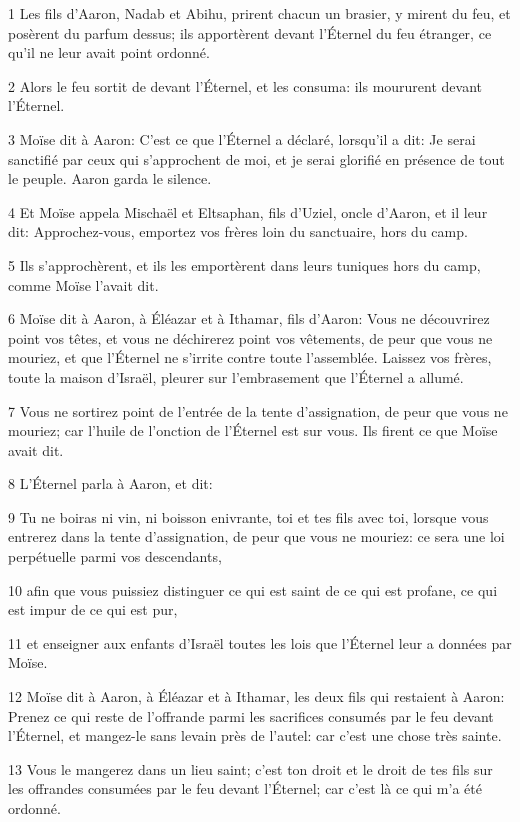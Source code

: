 \par 1 Les fils d'Aaron, Nadab et Abihu, prirent chacun un brasier, y mirent du feu, et posèrent du parfum dessus; ils apportèrent devant l'Éternel du feu étranger, ce qu'il ne leur avait point ordonné.
\par 2 Alors le feu sortit de devant l'Éternel, et les consuma: ils moururent devant l'Éternel.
\par 3 Moïse dit à Aaron: C'est ce que l'Éternel a déclaré, lorsqu'il a dit: Je serai sanctifié par ceux qui s'approchent de moi, et je serai glorifié en présence de tout le peuple. Aaron garda le silence.
\par 4 Et Moïse appela Mischaël et Eltsaphan, fils d'Uziel, oncle d'Aaron, et il leur dit: Approchez-vous, emportez vos frères loin du sanctuaire, hors du camp.
\par 5 Ils s'approchèrent, et ils les emportèrent dans leurs tuniques hors du camp, comme Moïse l'avait dit.
\par 6 Moïse dit à Aaron, à Éléazar et à Ithamar, fils d'Aaron: Vous ne découvrirez point vos têtes, et vous ne déchirerez point vos vêtements, de peur que vous ne mouriez, et que l'Éternel ne s'irrite contre toute l'assemblée. Laissez vos frères, toute la maison d'Israël, pleurer sur l'embrasement que l'Éternel a allumé.
\par 7 Vous ne sortirez point de l'entrée de la tente d'assignation, de peur que vous ne mouriez; car l'huile de l'onction de l'Éternel est sur vous. Ils firent ce que Moïse avait dit.
\par 8 L'Éternel parla à Aaron, et dit:
\par 9 Tu ne boiras ni vin, ni boisson enivrante, toi et tes fils avec toi, lorsque vous entrerez dans la tente d'assignation, de peur que vous ne mouriez: ce sera une loi perpétuelle parmi vos descendants,
\par 10 afin que vous puissiez distinguer ce qui est saint de ce qui est profane, ce qui est impur de ce qui est pur,
\par 11 et enseigner aux enfants d'Israël toutes les lois que l'Éternel leur a données par Moïse.
\par 12 Moïse dit à Aaron, à Éléazar et à Ithamar, les deux fils qui restaient à Aaron: Prenez ce qui reste de l'offrande parmi les sacrifices consumés par le feu devant l'Éternel, et mangez-le sans levain près de l'autel: car c'est une chose très sainte.
\par 13 Vous le mangerez dans un lieu saint; c'est ton droit et le droit de tes fils sur les offrandes consumées par le feu devant l'Éternel; car c'est là ce qui m'a été ordonné.
